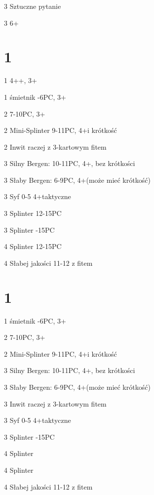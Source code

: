 \documentclass[12pt, a4paper]{article}
\begin{document}
\sequence{{1\diams}{1\spades}{3\diams}}
\begin{options}[2]
    \item[3\hearts] Sztuczne pytanie
    \item[3\spades] 6+\spades 
\end{options}

\pagebreak
\section*{1\hearts}

\sequence{{1\hearts}}
\begin{options}[2]
    \item[1\spades] 4+\spades {}+\spades, 3+\hearts  \gf
    \item[1\nt] \nf śmietnik -6PC, 3+\hearts
    \item[2\hearts] 7-10PC, 3+\hearts
    \item[2\spades] Mini-Splinter 9-11PC, 4+\hearts i krótkość \br
    \item[2\nt] Inwit raczej z 3-kartowym fitem  
    \item[3\clubs] Silny Bergen: 10-11PC, 4+\hearts, bez krótkości
    \item[3\diams] Słaby Bergen: 6-9PC, 4+\hearts (może mieć krótkość) \br
    \item[3\hearts] Syf 0-5 4+\hearts taktyczne
    \item[3\spades] Splinter 12-15PC
    \item[3\nt] Splinter -15PC   
    \item[4\clubs] Splinter 12-15PC
    \item[4\diams] Słabej jakości 11-12 z fitem  
\end{options}

\section*{1\spades}
\sequence{{1\spades}}
\begin{options}[2]
    \item[1\nt] \nf śmietnik -6PC, 3+\spades
    \item[2\spades] 7-10PC, 3+\spades
    \item[2\nt] Mini-Splinter 9-11PC, 4+\spades i krótkość \br
    \item[3\clubs] Silny Bergen: 10-11PC, 4+\spades, bez krótkości
    \item[3\diams] Słaby Bergen: 6-9PC, 4+\spades (może mieć krótkość)
    \item[3\hearts] Inwit raczej z 3-kartowym fitem \spades \br
    \item[3\spades] Syf 0-5 4+\spades taktyczne
    \item[3\nt] Splinter -15PC  
    \item[4\clubs] Splinter
    \item[4\diams] Splinter
    \item[4\hearts] Słabej jakości 11-12 z fitem    
\end{options}
\end{document}
